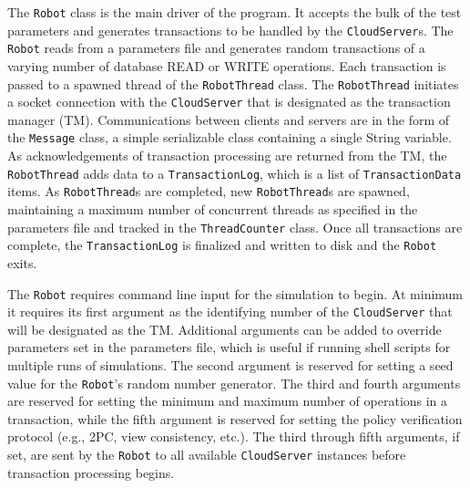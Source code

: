 \documentclass[11pt]{article}
\begin{document}
The \texttt{Robot} class is the main driver of the program. It accepts the bulk of the test parameters and generates transactions to be handled by the \texttt{CloudServer}s. The \texttt{Robot} reads from a parameters file and generates random transactions of a varying number of database READ or WRITE operations. Each transaction is passed to a spawned thread of the \texttt{RobotThread} class. The \texttt{RobotThread} initiates a socket connection with the \texttt{CloudServer} that is designated as the transaction manager (TM). Communications between clients and servers are in the form of the \texttt{Message} class, a simple serializable class containing a single String variable. As acknowledgements of transaction processing are returned from the TM, the \texttt{RobotThread} adds data to a \texttt{TransactionLog}, which is a list of \texttt{TransactionData} items. As \texttt{RobotThread}s are completed, new \texttt{RobotThread}s are spawned, maintaining a maximum number of concurrent threads as specified in the parameters file and tracked in the \texttt{ThreadCounter} class. Once all transactions are complete, the \texttt{TransactionLog} is finalized and written to disk and the \texttt{Robot} exits.

The \texttt{Robot} requires command line input for the simulation to begin. At minimum it requires its first argument as the identifying number of the \texttt{CloudServer} that will be designated as the TM. Additional arguments can be added to override parameters set in the parameters file, which is useful if running shell scripts for multiple runs of simulations. The second argument is reserved for setting a seed value for the \texttt{Robot}'s random number generator. The third and fourth arguments are reserved for setting the minimum and maximum number of operations in a transaction, while the fifth argument is reserved for setting the policy verification protocol (e.g., 2PC, view consistency, etc.). The third through fifth arguments, if set, are sent by the \texttt{Robot} to all available \texttt{CloudServer} instances before transaction processing begins.
\end{document}
